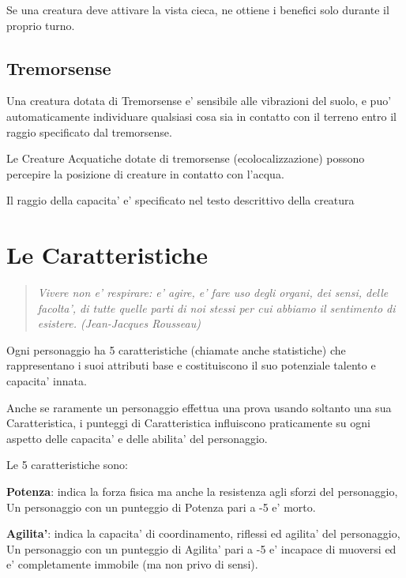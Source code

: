 \documentclass[a4paper,11pt,twoside,openany]{book}
\begin{document}
Se una creatura deve attivare la vista cieca, ne ottiene i benefici solo durante il proprio turno.

\subsection{Tremorsense}
Una creatura dotata di Tremorsense e' sensibile alle vibrazioni del suolo, e puo' automaticamente individuare qualsiasi cosa sia in contatto con il terreno entro il raggio specificato dal tremorsense.

Le Creature Acquatiche dotate di tremorsense (ecolocalizzazione) possono percepire la posizione di creature in contatto con l’acqua.

Il raggio della capacita' e' specificato nel testo descrittivo della creatura

\pagebreak

\section{Le Caratteristiche}

\label{le-caratteristiche}

\begin{quote}\textit{Vivere non e' respirare: e' agire, e' fare uso degli organi, dei sensi, delle facolta', di tutte quelle parti di noi stessi per cui abbiamo il sentimento di esistere. (Jean-Jacques Rousseau)
}\end{quote}


Ogni personaggio ha 5 caratteristiche (chiamate anche statistiche) che rappresentano i suoi attributi base e costituiscono il suo potenziale talento e capacita' innata. 

Anche se raramente un personaggio effettua una prova usando soltanto una sua Caratteristica, i punteggi di Caratteristica influiscono praticamente su ogni aspetto delle capacita' e delle abilita' del personaggio.

Le 5 caratteristiche sono:

\textbf{Potenza}: indica la forza fisica ma anche la resistenza agli sforzi del personaggio, Un personaggio con un punteggio di Potenza pari a -5 e' morto.

\textbf{Agilita'}: indica la capacita' di coordinamento, riflessi ed agilita' del personaggio, Un personaggio con un punteggio di Agilita' pari a -5 e' incapace di muoversi ed e' completamente immobile (ma non privo di sensi).
\end{document}
